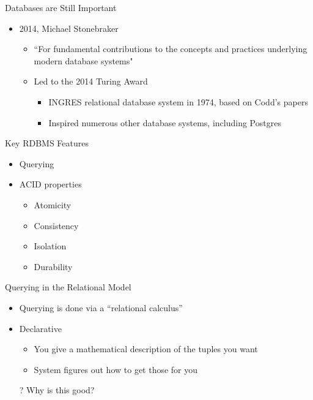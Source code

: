 \documentclass[aspectratio=169]{beamer}
\begin{document}
\begin{frame}{Databases are Still Important}

\begin{itemize}
\item 2014, Michael Stonebraker
	\begin{itemize}
	\item ``For fundamental contributions to the concepts and practices underlying modern database systems" 
	\item Led to the 2014 Turing Award
		\begin{itemize}
		\item INGRES relational database system in 1974, based on Codd's papers
		\item Inspired numerous other database systems, including Postgres
		\end{itemize}
	\end{itemize}
\end{itemize}
\end{frame}
\begin{frame}{Key RDBMS Features}

\begin{itemize}
\item Querying
\item ACID properties
	\begin{itemize}
	\item Atomicity
	\item Consistency
	\item Isolation
	\item Durability
	\end{itemize}
\end{itemize}
\end{frame}
\begin{frame}{Querying in the Relational Model}

\begin{itemize}
\item Querying is done via a ``relational calculus''
\item Declarative
	\begin{itemize}
	\item You give a mathematical description of the tuples you want
	\item System figures out how to get those for you
	\end{itemize}
\item[?] Why is this good?
\end{itemize}
\end{frame}
\end{document}
